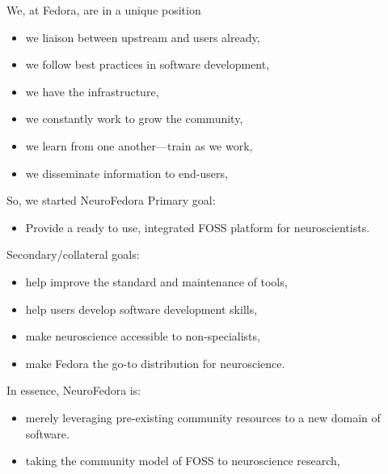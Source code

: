 \begin{frame}[c]{We, at Fedora, are in a unique position}
  \begin{itemize}
    \item we \alert{liaison between upstream and users} already,
      \pause{}
    \item we \alert{follow best practices} in software development,
      \pause{}
    \item we have the \alert{infrastructure},
      \pause{}
    \item we constantly \alert{work to grow the community},
      \pause{}
    \item we \alert{learn from one another}---train as we work,
      \pause{}
    \item we \alert{disseminate} information to end-users,
  \end{itemize}
\end{frame}
\begin{frame}[c]{So, we started NeuroFedora}
  \textcolor{FedoraBlue}{Primary goal:}
  \begin{itemize}
    \item Provide a \alert{ready to use, integrated FOSS platform} for neuroscientists\footnotemark[7].
  \end{itemize}
  \pause{}
  \textcolor{FirstGreen}{Secondary/collateral goals:}
  \pause{}
  \begin{itemize}
    \item help \alert{improve the standard and maintenance} of tools,
    \item help users \alert{develop software development skills},
    \item \alert{make neuroscience accessible} to non-specialists,
      \pause{}
    \item \alert{make Fedora the go-to distribution for neuroscience}.
  \end{itemize}
\end{frame}
\begin{frame}[c]{In essence,}
  \textcolor{FedoraBlue}{NeuroFedora is:\\}
  \begin{itemize}
    \item \textcolor{FriendsMagenta}{merely leveraging pre-existing community resources to a new domain of software.}\\
      \pause{}
    \item \textcolor{FeaturesOrange}{taking the community model of FOSS to neuroscience research,}
  \end{itemize}
\end{frame}

